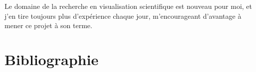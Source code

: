 \documentclass[12pt,a4paper,twoside]{article}
\begin{document}
    Le domaine de la recherche en visualisation scientifique est nouveau pour moi, et j'en tire toujours plus
    d'expérience chaque jour, m'encourageant d'avantage à mener ce projet à son terme.

    \newpage



    \newpage
    \section{Bibliographie}                         %

    
    \nocite{*}
\end{document}
